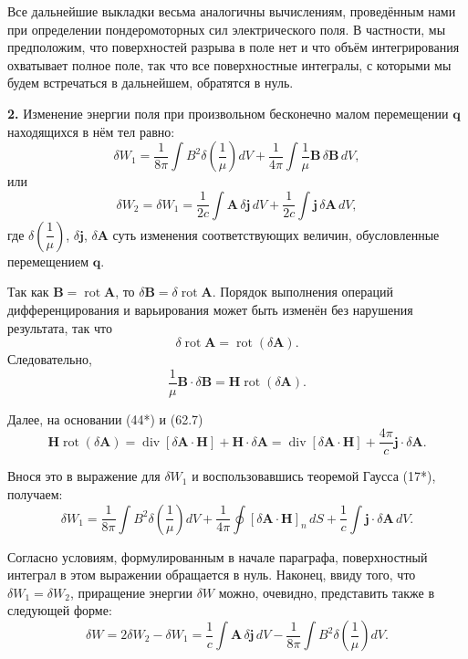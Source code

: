 \documentclass[a4paper,12pt]{article}
\begin{document}
Все дальнейшие выкладки весьма аналогичны вычислениям, проведённым
нами при определении пондеромоторных сил электрического поля.
В частности, мы предположим, что поверхностей разрыва в поле нет и
что объём интегрирования охватывает полное поле, так что все
поверхностные интегралы, с которыми мы будем встречаться в дальнейшем,
обратятся в нуль.

\textbf{2.} Изменение энергии поля при произвольном бесконечно малом
перемещении $\mathbf{q}$ находящихся в нём тел равно:
$$
    \delta W_1 = \frac{1}{8\pi}\int B^2\delta\!\left(\frac{1}{\mu}\right)dV
               + \frac{1}{4\pi}\int \frac{1}{\mu}\mathbf{B}\,\delta\mathbf{B}\,dV,
$$
или
$$
    \delta W_2 = \delta W_1 = \frac{1}{2c}\int \mathbf{A}\,\delta\mathbf{j}\,dV
               + \frac{1}{2c}\int \mathbf{j}\,\delta\mathbf{A}\,dV,
$$
где $\delta\!\left(\dfrac{1}{\mu}\right)$, $\delta\mathbf{j}$,
$\delta\mathbf{A}$ суть изменения соответствующих величин, обусловленные
перемещением $\mathbf{q}$.

Так как $\mathbf{B} = \operatorname{rot}\mathbf{A}$, то
$\delta\mathbf{B} = \delta\operatorname{rot}\mathbf{A}$. Порядок
выполнения операций дифференцирования и варьирования может быть изменён
без нарушения результата, так что
$$
    \delta\operatorname{rot}\mathbf{A} = \operatorname{rot}(\delta\mathbf{A}).
$$
Следовательно,
$$
    \frac{1}{\mu}\mathbf{B}\cdot\delta\mathbf{B}
    = \mathbf{H}\operatorname{rot}(\delta\mathbf{A}).
$$





Далее, на основании (44*) и (62.7)
$$
    \mathbf{H}\operatorname{rot}(\delta\mathbf{A})
    = \operatorname{div}[\delta\mathbf{A}\cdot\mathbf{H}]
    + \mathbf{H}\cdot\delta\mathbf{A}
    = \operatorname{div}[\delta\mathbf{A}\cdot\mathbf{H}]
    + \frac{4\pi}{c}\mathbf{j}\cdot\delta\mathbf{A}.
$$

Внося это в выражение для $\delta W_1$ и воспользовавшись теоремой
Гаусса (17*), получаем:
$$
    \delta W_1 = \frac{1}{8\pi}\int B^2\delta\!\left(\frac{1}{\mu}\right)dV
               + \frac{1}{4\pi}\oint[\delta\mathbf{A}\cdot\mathbf{H}]_n\,dS
               + \frac{1}{c}\int\mathbf{j}\cdot\delta\mathbf{A}\,dV.
$$

Согласно условиям, формулированным в начале параграфа, поверхностный
интеграл в этом выражении обращается в нуль. Наконец, ввиду того, что
$\delta W_1 = \delta W_2$, приращение энергии $\delta W$ можно, очевидно,
представить также в следующей форме:
$$
    \delta W = 2\delta W_2 - \delta W_1
             = \frac{1}{c}\int\mathbf{A}\,\delta\mathbf{j}\,dV
             - \frac{1}{8\pi}\int B^2\delta\!\left(\frac{1}{\mu}\right)dV.
$$
\end{document}

